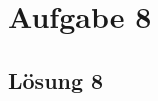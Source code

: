 \documentclass[main.tex]{subfiles}
\begin{document}
\section{Aufgabe 8}

\subsection{Lösung 8}
\end{document}
